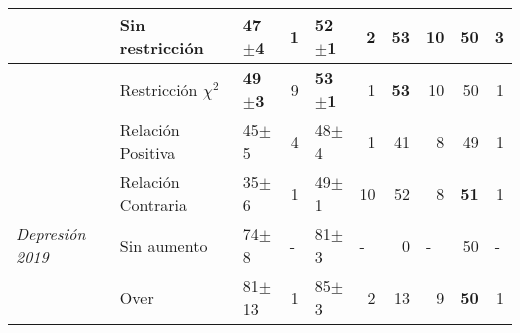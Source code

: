 \begin{table}[ht]
\begin{center}
{\begin{tabular}{lllrlrrrrr}
                           & \cellcolor[HTML]{EFEFEF}Sin restricción & \cellcolor[HTML]{EFEFEF}47$\pm$4          & \cellcolor[HTML]{EFEFEF}1                     & \cellcolor[HTML]{EFEFEF}52$\pm$1 & \cellcolor[HTML]{EFEFEF}2                     & \cellcolor[HTML]{EFEFEF}53 & \cellcolor[HTML]{EFEFEF}10                    & \cellcolor[HTML]{EFEFEF}50          & \cellcolor[HTML]{EFEFEF}3                     \\ \hline
                           & Restricción $\chi^2$                         & \textbf{49$\pm$3}                         & 9                                             & \textbf{53$\pm$1}                                  & 1                                             & \textbf{53}                         & 10                                            & 50                                  & 1                                             \\ \hline
                           & Relación Positiva                       & 45$\pm$5                                  & 4                                             & 48$\pm$4                                  & 1                                             & 41                                  & 8                                             & 49                                  & 1                                             \\ \hline
                           & Relación Contraria                      & 35$\pm$6                                  & 1                                             & 49$\pm$1                                  & 10                                            & 52                                  & 8                                             & \textbf{51}                         & 1                                             \\ \hline
\textit{Depresión 2019}    & \cellcolor[HTML]{C0C0C0}Sin aumento     & \cellcolor[HTML]{C0C0C0}74$\pm$8          & \multicolumn{1}{l}{\cellcolor[HTML]{C0C0C0}-} & \cellcolor[HTML]{C0C0C0}81$\pm$3          & \multicolumn{1}{l}{\cellcolor[HTML]{C0C0C0}-} & \cellcolor[HTML]{C0C0C0}0           & \multicolumn{1}{l}{\cellcolor[HTML]{C0C0C0}-} & \cellcolor[HTML]{C0C0C0}50          & \multicolumn{1}{l}{\cellcolor[HTML]{C0C0C0}-} \\ \hline
                           & \cellcolor[HTML]{EFEFEF}Over            & \cellcolor[HTML]{EFEFEF}81$\pm$13         & \cellcolor[HTML]{EFEFEF}1                     & \cellcolor[HTML]{EFEFEF}85$\pm$3          & \cellcolor[HTML]{EFEFEF}2                     & \cellcolor[HTML]{EFEFEF}13          & \cellcolor[HTML]{EFEFEF}9            & \cellcolor[HTML]{EFEFEF}\textbf{50} & \cellcolor[HTML]{EFEFEF}1                     \\ \hline

\end{tabular}}
\end{center}
\end{table}
